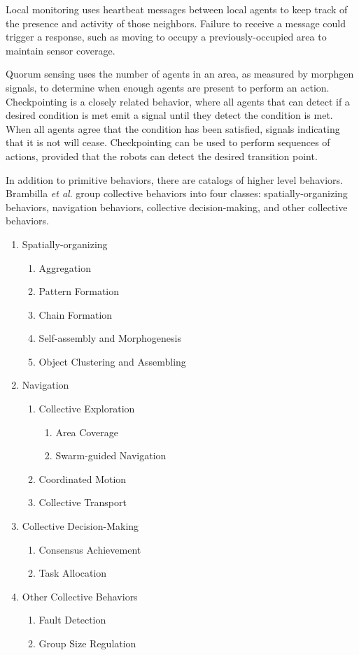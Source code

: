\documentclass[]{article}
\begin{document}
Local monitoring uses heartbeat messages between local agents to keep track of the presence and activity of those neighbors. Failure to receive a message could trigger a response, such as moving to occupy a previously-occupied area to maintain sensor coverage.

Quorum sensing uses the number of agents in an area, as measured by morphgen signals, to determine when enough agents are present to perform an action. 
Checkpointing is a closely related behavior, where all agents that can detect if a desired condition is met emit a signal until they detect the condition is met. 
When all agents agree that the condition has been satisfied, signals indicating that it is not will cease. 
Checkpointing can be used to perform sequences of actions, provided that the robots can detect the desired transition point. 

In addition to primitive behaviors, there are catalogs of higher level behaviors. 
Brambilla \textit{et al}. group collective behaviors into four classes: spatially-organizing behaviors, navigation behaviors, collective decision-making, and other collective behaviors.

\begin{enumerate}[noitemsep]
\item Spatially-organizing
	\begin{enumerate}[noitemsep]
	\item Aggregation
	\item Pattern Formation
	\item Chain Formation
	\item Self-assembly and Morphogenesis
	\item Object Clustering and Assembling
	\end{enumerate}
\item Navigation
	\begin{enumerate}[noitemsep]
	\item Collective Exploration
		\begin{enumerate}[noitemsep]
		\item Area Coverage
		\item Swarm-guided Navigation
		\end{enumerate}
	\item Coordinated Motion
	\item Collective Transport
	\end{enumerate}
\item Collective Decision-Making
	\begin{enumerate}[noitemsep]
	\item Consensus Achievement
	\item Task Allocation
	\end{enumerate}
\item Other Collective Behaviors
	\begin{enumerate}[noitemsep]
	\item Fault Detection
	\item Group Size Regulation
	\end{enumerate}
\end{enumerate}
\end{document}
